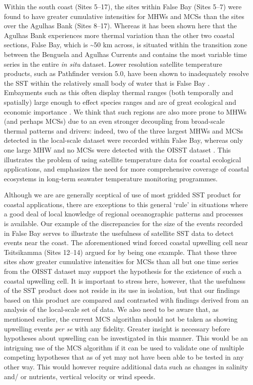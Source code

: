 \documentclass[a4paper,10pt,review]{elsarticle}
\begin{document}
Within the south coast (Sites 5--17), the sites within False Bay (Sites 5--7) were found to have greater cumulative intensities for MHWs and MCSs than the sites over the Agulhas Bank (Sites 8--17). Whereas it has been shown here that the Agulhas Bank experiences more thermal variation than the other two coastal sections, False Bay, which is \textasciitilde50 km across, is situated within the transition zone between the Benguela and Agulhas Currents \citep{Smit2013} and contains the most variable time series in the entire \emph{in situ} dataset. Lower resolution satellite temperature products, such as Pathfinder version 5.0, have been shown to inadequately resolve the SST within the relatively small body of water that is False Bay \citep{Dufois2012}. Embayments such as this often display thermal ranges (both temporally and spatially) large enough to effect species ranges \citep{Ling2009} and are of great ecological \citep{Klumb2003} and economic importance \citep{Lugendo2005}. We think that such regions are also more prone to MHWs (and perhaps MCSs) due to an even stronger decoupling from broad-scale thermal patterns and drivers: indeed, two of the three largest MHWs and MCSs detected in the local-scale dataset were recorded within False Bay, whereas only one large MHW and no MCSs were detected with the OISST dataset . This illustrates the problem of using satellite temperature data for coastal ecological applications, and emphasizes the need for more comprehensive coverage of coastal ecosystems in long-term seawater temperature monitoring programmes.

Although we are are generally sceptical of use of most gridded SST product for coastal applications, there are exceptions to this general `rule' in situations where a good deal of local knowledge of regional oceanographic patterns and processes is available. Our example of the discrepancies for the size of the events recorded in False Bay serves to illustrate the usefulness of satellite SST data to detect events near the coast. The aforementioned wind forced coastal upwelling cell near Tsitsikamma (Sites 12--14) argued for by \citet{Roberts2005} being one example. That these three sites show greater cumulative intensities for MCSs than all but one time series from the OISST dataset may support the hypothesis for the existence of such a coastal upwelling cell. It is important to stress here, however, that the usefulness of the SST product does not reside in its use in isolation, but that our findings based on this product are compared and contrasted with findings derived from an analysis of the local-scale set of data. We also need to be aware that, as mentioned earlier, the current MCS algorithm should not be taken as showing upwelling events \emph{per se} with any fidelity. Greater insight is necessary before hypotheses about upwelling can be investigated in this manner. This would be an intriguing use of the MCS algorithm if it can be used to validate one of multiple competing hypotheses that as of yet may not have been able to be tested in any other way. This would however require additional data such as changes in salinity and/ or nutrients, vertical velocity or wind speeds.
\end{document}
